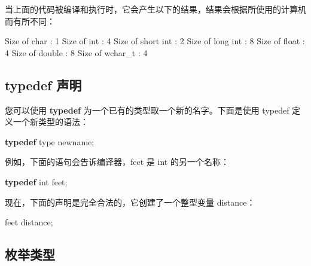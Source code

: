 \documentclass[
]{article}
\newenvironment{Shaded}{}{}
\newcommand{\DataTypeTok}[1]{\textcolor[rgb]{0.56,0.13,0.00}{#1}}
\newcommand{\DecValTok}[1]{\textcolor[rgb]{0.25,0.63,0.44}{#1}}
\newcommand{\KeywordTok}[1]{\textcolor[rgb]{0.00,0.44,0.13}{\textbf{#1}}}
\newcommand{\NormalTok}[1]{#1}
\newcommand{\OperatorTok}[1]{\textcolor[rgb]{0.40,0.40,0.40}{#1}}
\begin{document}
当上面的代码被编译和执行时，它会产生以下的结果，结果会根据所使用的计算机而有所不同：

\begin{Shaded}
\begin{Highlighting}[]
\NormalTok{Size of }\DataTypeTok{char} \OperatorTok{:} \DecValTok{1}
\NormalTok{Size of }\DataTypeTok{int} \OperatorTok{:} \DecValTok{4}
\NormalTok{Size of }\DataTypeTok{short} \DataTypeTok{int} \OperatorTok{:} \DecValTok{2}
\NormalTok{Size of }\DataTypeTok{long} \DataTypeTok{int} \OperatorTok{:} \DecValTok{8}
\NormalTok{Size of }\DataTypeTok{float} \OperatorTok{:} \DecValTok{4}
\NormalTok{Size of }\DataTypeTok{double} \OperatorTok{:} \DecValTok{8}
\NormalTok{Size of }\DataTypeTok{wchar\_t} \OperatorTok{:} \DecValTok{4}
\end{Highlighting}
\end{Shaded}

\hypertarget{typedef-ux58f0ux660e}{%
\subsection{typedef 声明}\label{typedef-ux58f0ux660e}}

您可以使用 \textbf{typedef} 为一个已有的类型取一个新的名字。下面是使用
typedef 定义一个新类型的语法：

\begin{Shaded}
\begin{Highlighting}[]
\KeywordTok{typedef}\NormalTok{ type newname}\OperatorTok{;}
\end{Highlighting}
\end{Shaded}

例如，下面的语句会告诉编译器，feet 是 int 的另一个名称：

\begin{Shaded}
\begin{Highlighting}[]
\KeywordTok{typedef} \DataTypeTok{int}\NormalTok{ feet}\OperatorTok{;}
\end{Highlighting}
\end{Shaded}

现在，下面的声明是完全合法的，它创建了一个整型变量 distance：

\begin{Shaded}
\begin{Highlighting}[]
\NormalTok{feet distance}\OperatorTok{;}
\end{Highlighting}
\end{Shaded}

\hypertarget{ux679aux4e3eux7c7bux578b}{%
\subsection{枚举类型}\label{ux679aux4e3eux7c7bux578b}}
\end{document}

